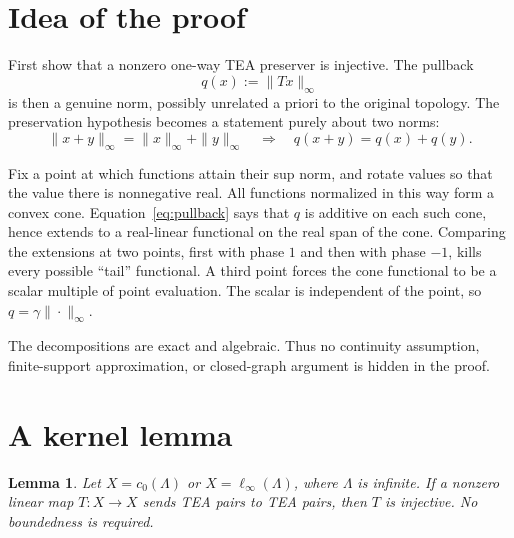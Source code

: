 \documentclass[11pt]{article}
\newtheorem{lemma}[theorem]{Lemma}
\begin{document}
\section{Idea of the proof}

First show that a nonzero one-way TEA preserver is injective.  The pullback
\[
 q(x):=\|Tx\|_\infty
\]
is then a genuine norm, possibly unrelated a priori to the original topology.
The preservation hypothesis becomes a statement purely about two norms:
\begin{equation}\label{eq:pullback}
 \|x+y\|_\infty=\|x\|_\infty+\|y\|_\infty
 \quad\Longrightarrow\quad
 q(x+y)=q(x)+q(y).
\end{equation}

Fix a point at which functions attain their sup norm, and rotate values so
that the value there is nonnegative real.  All functions normalized in this
way form a convex cone.  Equation~\eqref{eq:pullback} says that $q$ is
additive on each such cone, hence extends to a real-linear functional on the
real span of the cone.  Comparing the extensions at two points, first with
phase $1$ and then with phase $-1$, kills every possible ``tail'' functional.
A third point forces the cone functional to be a scalar multiple of point
evaluation.  The scalar is independent of the point, so
$q=\gamma\|\cdot\|_\infty$.

The decompositions are exact and algebraic.  Thus no continuity assumption,
finite-support approximation, or closed-graph argument is hidden in the
proof.

\section{A kernel lemma}

\begin{lemma}\label{lem:kernel}
Let $X=c_0(\Lambda)$ or $X=\ell_\infty(\Lambda)$, where $\Lambda$ is
infinite.  If a nonzero linear map $T:X\to X$ sends TEA pairs to TEA pairs,
then $T$ is injective.  No boundedness is required.
\end{lemma}
\end{document}
